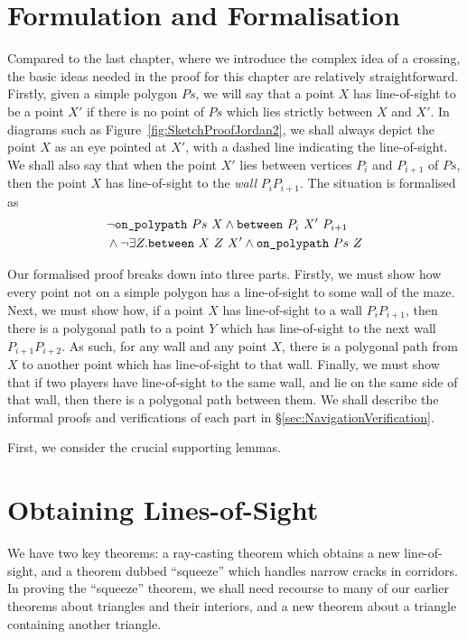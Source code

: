 \section{Formulation and Formalisation}\label{sec:Jordan2Formulation}
Compared to the last chapter, where we introduce the complex idea of a crossing, the basic ideas needed in the proof for this chapter are relatively straightforward. Firstly, given a simple polygon $Ps$, we will say that a point $X$ has line-of-sight to be a point $X'$ if there is no point of $Ps$ which lies strictly between $X$ and $X'$. In diagrams such as Figure~\ref{fig:SketchProofJordan2}, we shall always depict the point $X$ as an eye pointed at $X'$, with a dashed line indicating the line-of-sight. We shall also say that when the point $X'$ lies between vertices $P_i$ and $P_{i+1}$ of $Ps$, then the point $X$ has line-of-sight to the \emph{wall} $P_iP_{i+1}$. The situation is formalised as
\begin{displaymath}
  \begin{aligned}
    &\neg\texttt{on\_polypath}\ Ps\ X \wedge \texttt{between}\ P_i\ X'\ P_{i+1}\\
    &\wedge \neg\exists Z. \texttt{between}\ X\ Z\ X' \wedge \texttt{on\_polypath}\ Ps\ Z
  \end{aligned}
\end{displaymath}

Our formalised proof breaks down into three parts. Firstly, we must show how every point not on a simple polygon has a line-of-sight to some wall of the maze. Next, we must show how, if a point $X$ has line-of-sight to a wall $P_iP_{i+1}$, then there is a polygonal path to a point $Y$ which has line-of-sight to the next wall $P_{i+1}P_{i+2}$. As such, for any wall and any point $X$, there is a polygonal path from $X$ to another point which has line-of-sight to that wall. Finally, we must show that if two players have line-of-sight to the same wall, and lie on the same side of that wall, then there is a polygonal path between them.
We shall describe the informal proofs and verifications of each part in \S\ref{sec:NavigationVerification}.

First, we consider the crucial supporting lemmas.

\section{Obtaining Lines-of-Sight}\label{sec:Jordan2Lemmas}
We have two key theorems: a ray-casting theorem which obtains a new line-of-sight, and a theorem dubbed ``squeeze'' which handles narrow cracks in corridors. In proving the ``squeeze'' theorem, we shall need recourse to many of our earlier theorems about triangles and their interiors, and a new theorem about a triangle containing another triangle.

